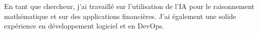 En tant que chercheur, j'ai travaillé sur l'utilisation de l'IA pour le raisonnement mathématique et sur des applications financières. J'ai également une solide expérience en développement logiciel et en DevOps.
